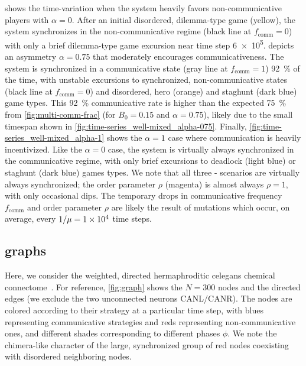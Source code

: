 \documentclass[pdflatex,lineno,referee,sn-nature]{sn-jnl}
\begin{document}
 shows the time-variation
when the system heavily favors non-communicative players
with $\alpha = 0$.
After an initial disordered, dilemma-type game (yellow),
the system synchronizes in the non-communicative regime
(black line at $f_{\text{comm}} = 0$)
with only a brief dilemma-type game excursion near time step \num{6e5}.
 depicts an asymmetry $\alpha = 0.75$
that moderately encourages communicativeness.
The system is synchronized in a communicative state
(gray line at $f_{\text{comm}} = 1$) \SI{92}{\percent} of the time,
with unstable excursions to synchronized, non-communicative states
(black line at $f_{\text{comm}} = 0$)
and disordered, hero (orange) and staghunt (dark blue) game types.
This \SI{92}{\percent} communicative rate is higher than the expected \SI{75}{\percent}
from \cref{fig:multi-comm-frac} (for $B_0 = 0.15$ and $\alpha = 0.75$),
likely due to the small timespan shown in
\cref{fig:time-series_well-mixed_alpha-075}.
Finally, \cref{fig:time-series_well-mixed_alpha-1} shows the
$\alpha = 1$ case where communication is heavily incentivized.
Like the  $\alpha = 0$ case,
the system is virtually always synchronized in the communicative regime,
with only brief excursions to deadlock (light blue)
or staghunt (dark blue) games types.
We note that all three
-
scenarios are virtually always synchronized;
the order parameter $\rho$ (magenta) is almost always $\rho = 1$,
with only occasional dips.
The temporary drops in communicative frequency $f_{\text{comm}}$
and order parameter $\rho$ are likely the result of mutations
which occur, on average, every $1/\mu = \num{1E4}$ time steps.

\subsection{ graphs}\label{sec:elegans_graph}

Here, we consider the weighted, directed hermaphroditic \gls{celegans}
chemical connectome~\citep{cook2019whole}.
For reference, \cref{fig:graph} shows the $N = 300$ nodes and the directed edges
(we exclude the two unconnected neurons CANL/CANR).
The nodes are colored according to their strategy at a particular time step,
with blues representing communicative strategies
and reds representing non-communicative ones,
and different shades corresponding to different phases $\phi$.
We note the chimera-like character
of the large, synchronized group of red nodes
coexisting with disordered neighboring nodes.
\end{document}
